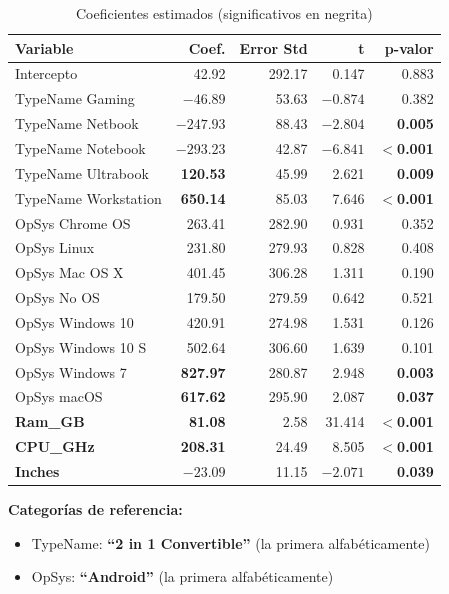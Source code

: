 \documentclass[12pt,a4paper]{article}
\begin{document}
\begin{table}[H]
\centering
\caption{Coeficientes estimados (significativos en negrita)}
\begin{tabular}{lrrrr}
\toprule
\textbf{Variable} & \textbf{Coef.} & \textbf{Error Std} & \textbf{t} & \textbf{p-valor} \\
\midrule
Intercepto & 42.92 & 292.17 & 0.147 & 0.883 \\
TypeName Gaming & $-46.89$ & 53.63 & $-0.874$ & 0.382 \\
TypeName Netbook & \textbf{$-247.93$} & 88.43 & $-2.804$ & \textbf{0.005} \\
TypeName Notebook & \textbf{$-293.23$} & 42.87 & $-6.841$ & \textbf{$<$0.001} \\
TypeName Ultrabook & \textbf{120.53} & 45.99 & 2.621 & \textbf{0.009} \\
TypeName Workstation & \textbf{650.14} & 85.03 & 7.646 & \textbf{$<$0.001} \\
OpSys Chrome OS & 263.41 & 282.90 & 0.931 & 0.352 \\
OpSys Linux & 231.80 & 279.93 & 0.828 & 0.408 \\
OpSys Mac OS X & 401.45 & 306.28 & 1.311 & 0.190 \\
OpSys No OS & 179.50 & 279.59 & 0.642 & 0.521 \\
OpSys Windows 10 & 420.91 & 274.98 & 1.531 & 0.126 \\
OpSys Windows 10 S & 502.64 & 306.60 & 1.639 & 0.101 \\
OpSys Windows 7 & \textbf{827.97} & 280.87 & 2.948 & \textbf{0.003} \\
OpSys macOS & \textbf{617.62} & 295.90 & 2.087 & \textbf{0.037} \\
\textbf{Ram\_GB} & \textbf{81.08} & 2.58 & 31.414 & \textbf{$<$0.001} \\
\textbf{CPU\_GHz} & \textbf{208.31} & 24.49 & 8.505 & \textbf{$<$0.001} \\
\textbf{Inches} & \textbf{$-23.09$} & 11.15 & $-2.071$ & \textbf{0.039} \\
\bottomrule
\end{tabular}
\end{table}

\textbf{Categorías de referencia:}
\begin{itemize}
    \item TypeName: \textbf{``2 in 1 Convertible''} (la primera alfabéticamente)
    \item OpSys: \textbf{``Android''} (la primera alfabéticamente)
\end{itemize}
\end{document}
